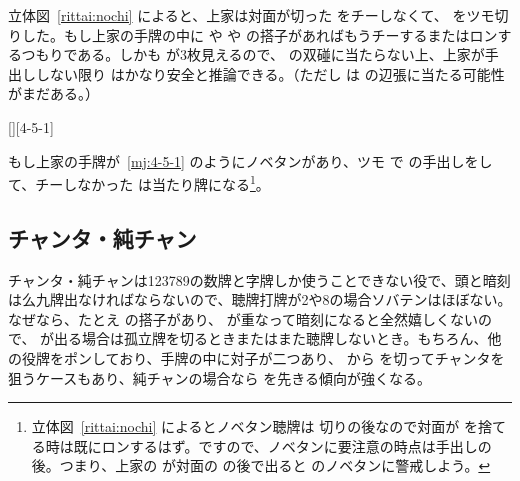 \documentclass[../nankiru_main.tex]{subfiles}
\begin{document}
\begin{rittai}[h]
  \centering
  
  
  \caption{6巡目に上家がドラ  をポンして打  \citep[][p.~72]{takizawa-yomi}}
  \label{rittai:nochi}
\end{rittai}

立体図~\ref{rittai:nochi} によると、上家は対面が切った  をチーしなくて、 をツモ切りした。もし上家の手牌の中に  や  や  の搭子があればもうチーするまたはロンするつもりである。しかも  が3枚見えるので、 の双碰に当たらない上、上家が手出ししない限り  はかなり安全と推論できる。（ただし  は の辺張に当たる可能性がまだある。）

[][4-5-1]

もし上家の手牌が~\ref{mj:4-5-1} のようにノベタンがあり、ツモ  で  の手出しをして、チーしなかった  は当たり牌になる\footnote{立体図~\ref{rittai:nochi} によるとノベタン聴牌は  切りの後なので対面が  を捨てる時は既にロンするはず。ですので、ノベタンに要注意の時点は手出しの後。つまり、上家の  が対面の  の後で出ると  のノベタンに警戒しよう。}。

\subsection{チャンタ・純チャン}

チャンタ・純チャンは123789の数牌と字牌しか使うことできない役で、頭と暗刻は么九牌出なければならないので、聴牌打牌が2や8の場合ソバテンはほぼない\citep[][p.~74]{takizawa-yomi}。なぜなら、たとえ  の搭子があり、 が重なって暗刻になると全然嬉しくないので、 が出る場合は孤立牌を切るときまたはまた聴牌しないとき。もちろん、他の役牌をポンしており、手牌の中に対子が二つあり、 から  を切ってチャンタを狙うケースもあり、純チャンの場合なら  を先きる傾向が強くなる。
\end{document}
